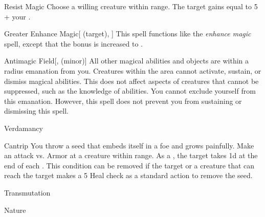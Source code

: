 \lowercase{\hypertarget{spell:Resist Magic}{}}\label{spell:Resist Magic}
\begin{ability}[\nth{5}]{\hypertarget{spell:Resist Magic}{Resist Magic}}
Choose a willing creature within \rngmed range.
The target gains  equal to 5 + your .
\end{ability}
\vspace{0.25em}



\lowercase{\hypertarget{spell:Greater Enhance Magic}{}}\label{spell:Greater Enhance Magic}
\begin{ability}[\nth{6}]{\hypertarget{spell:Greater Enhance Magic}{Greater Enhance Magic}}[ (target), ]
This spell functions like the \textit{enhance magic} spell, except that the bonus is increased to .
\end{ability}
\vspace{0.25em}



\lowercase{\hypertarget{spell:Antimagic Field}{}}\label{spell:Antimagic Field}
\begin{ability}[\nth{7}]{\hypertarget{spell:Antimagic Field}{Antimagic Field}}[,  (minor)]
All other magical abilities and objects are  within a \areamed radius emanation from you.
Creatures within the area cannot activate, sustain, or dismiss magical abilities.
This does not affect aspects of creatures that cannot be suppressed, such as the knowledge of abilities.
You cannot exclude yourself from this emanation.
However, this spell does not prevent you from sustaining or dismissing this spell.
\end{ability}
\vspace{0.25em}


\newpage
\begin{spellsection}{Verdamancy}

\begin{spellheader}
\end{spellheader}


\begin{ability}{Cantrip}
You throw a seed that embeds itself in a foe and grows painfully.
Make an attack vs. Armor at a creature within \rngclose range.
\hit As a , the target takes  \minus1d at the end of each .
This condition can be removed if the target or a creature that can reach the target makes a  5 Heal check as a standard action to remove the seed.
\end{ability}




 Transmutation

 Nature
\end{spellsection}



